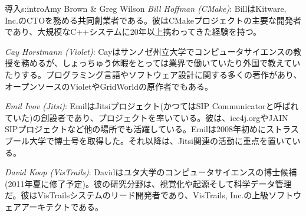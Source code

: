 \begin{aosachapter}{導入}{s:intro}{Amy Brown \& Greg Wilson}
\emph{Bill Hoffman (CMake)}: BillはKitware, Inc.のCTOを務める共同創業者である。彼はCMakeプロジェクトの主要な開発者であり、大規模なC++システムに20年以上携わってきた経験を持つ。

\emph{Cay Horstmann (Violet)}: Cayはサンノゼ州立大学でコンピュータサイエンスの教授を務めるが、しょっちゅう休暇をとっては業界で働いていたり外国で教えていたりする。プログラミング言語やソフトウェア設計に関する多くの著作があり、オープンソースのVioletやGridWorldの原作者でもある。

\emph{Emil Ivov (Jitsi)}: EmilはJitsiプロジェクト(かつてはSIP Communicatorと呼ばれていた)の創設者であり、プロジェクトを率いている。彼は、ice4j.orgやJAIN SIPプロジェクトなど他の場所でも活躍している。Emilは2008年初めにストラスブール大学で博士号を取得した。それ以降は、Jitsi関連の活動に重点を置いている。

\emph{David Koop (VisTrails)}: Davidはユタ大学のコンピュータサイエンスの博士候補(2011年夏に修了予定)。彼の研究分野は、視覚化や起源そして科学データ管理だ。彼はVisTrailsシステムのリード開発者であり、VisTrails, Inc.の上級ソフトウェアアーキテクトである。


\end{aosachapter}

